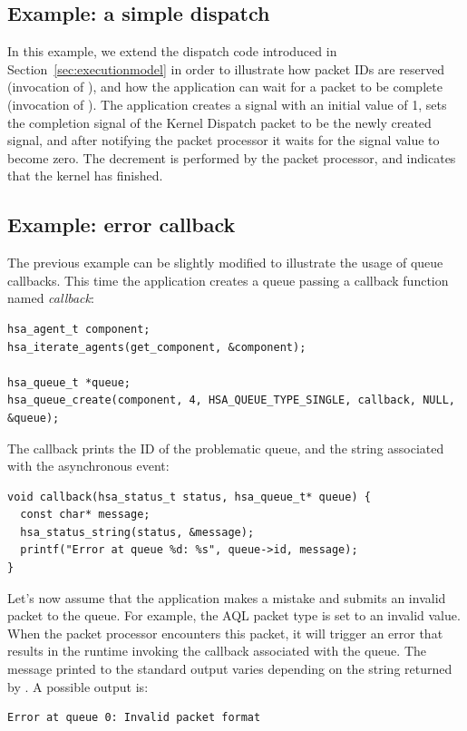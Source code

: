 \documentclass[final,oneside]{book}
\begin{document}
\subsection{Example: a simple dispatch}
In this example, we extend the dispatch code introduced in
Section~\ref{sec:executionmodel} in order to illustrate how packet IDs are
reserved (invocation of ), and how the
application can wait for a packet to be complete (invocation of
). The application creates a signal with an
initial value of 1, sets the completion signal of the Kernel Dispatch packet to
be the newly created signal, and after notifying the packet processor it waits
for the signal value to become zero. The decrement is performed by the packet
processor, and indicates that the kernel has finished.



\subsection{Example: error callback}
The previous example can be slightly modified to illustrate the usage of queue
callbacks. This time the application creates a queue passing a callback function
named \emph{callback}:
\begin{lstlisting}
hsa_agent_t component;
hsa_iterate_agents(get_component, &component);

hsa_queue_t *queue;
hsa_queue_create(component, 4, HSA_QUEUE_TYPE_SINGLE, callback, NULL, &queue);
\end{lstlisting}

The callback prints the ID of the problematic queue, and the string associated
with the asynchronous event:
\begin{lstlisting}
void callback(hsa_status_t status, hsa_queue_t* queue) {
  const char* message;
  hsa_status_string(status, &message);
  printf("Error at queue %d: %s", queue->id, message);
}
\end{lstlisting}
Let's now assume that the application makes a mistake and submits an invalid
packet to the queue. For example, the AQL packet type is set to an invalid
value. When the packet processor encounters this packet, it will trigger an
error that results in the runtime invoking the callback associated with the
queue. The message printed to the standard output varies depending on the string
returned by . A possible output is:
\begin{lstlisting}
Error at queue 0: Invalid packet format
\end{lstlisting}
\end{document}
